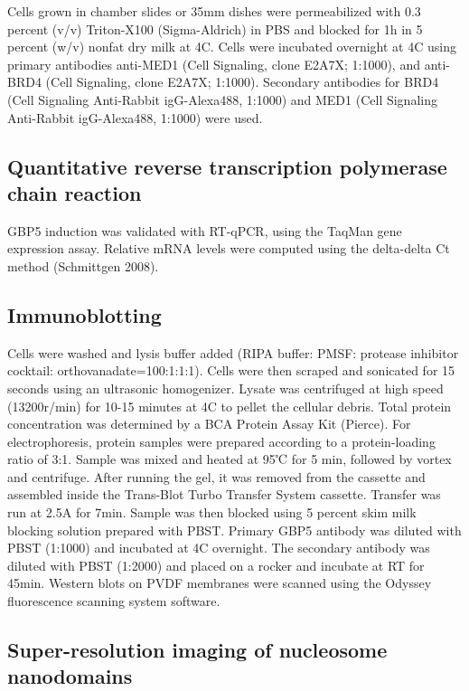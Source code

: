 \documentclass{ucetd}
\begin{document}
Cells grown in chamber slides or 35mm dishes were permeabilized with 0.3  percent  (v/v) Triton-X100 (Sigma-Aldrich) in PBS and blocked for 1h in 5  percent  (w/v) nonfat dry milk at 4C. Cells were incubated overnight at 4C using primary antibodies anti-MED1 (Cell Signaling, clone E2A7X; 1:1000), and anti-BRD4 (Cell Signaling, clone E2A7X; 1:1000). Secondary antibodies for BRD4 (Cell Signaling Anti-Rabbit igG-Alexa488, 1:1000) and MED1 (Cell Signaling Anti-Rabbit igG-Alexa488, 1:1000) were used. 

\subsection{Quantitative reverse transcription polymerase chain reaction}

GBP5 induction was validated with RT-qPCR, using the TaqMan gene expression assay. Relative mRNA levels were computed using the delta-delta Ct method (Schmittgen 2008). 

\subsection{Immunoblotting}

Cells were washed and lysis buffer added (RIPA buffer: PMSF: protease inhibitor cocktail: orthovanadate=100:1:1:1). Cells were then scraped and sonicated for 15 seconds using an ultrasonic homogenizer. Lysate was centrifuged at high speed (13200r/min) for 10-15 minutes at 4C to pellet the cellular debris. Total protein concentration was determined by a BCA Protein Assay Kit (Pierce). For electrophoresis, protein samples were prepared according to a protein-loading ratio of 3:1. Sample was mixed and heated at 95℃ for 5 min, followed by vortex and centrifuge. After running the gel, it was removed from the cassette and assembled inside the Trans-Blot Turbo Transfer System cassette. Transfer was run at 2.5A for 7min. Sample was then blocked using 5  percent  skim milk blocking solution prepared with PBST. Primary GBP5 antibody was diluted with PBST (1:1000) and incubated at 4C overnight. The secondary antibody was diluted with PBST (1:2000) and placed on a rocker and incubate at RT for 45min. Western blots on PVDF membranes were scanned using the Odyssey fluorescence scanning system software. 

\subsection{Super-resolution imaging of nucleosome nanodomains}
\end{document}
